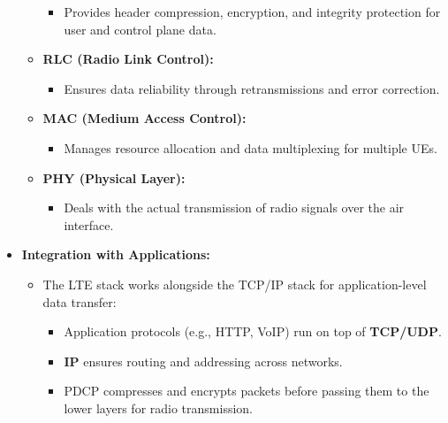 \begin{itemize}
\begin{itemize}
\begin{itemize}
            \item Provides header compression, encryption, and integrity protection for user and control plane data.
        \end{itemize}
        \item \textbf{RLC (Radio Link Control):}
        \begin{itemize}
            \item Ensures data reliability through retransmissions and error correction.
        \end{itemize}
        \item \textbf{MAC (Medium Access Control):}
        \begin{itemize}
            \item Manages resource allocation and data multiplexing for multiple UEs.
        \end{itemize}
        \item \textbf{PHY (Physical Layer):}
        \begin{itemize}
            \item Deals with the actual transmission of radio signals over the air interface.
        \end{itemize}
    \end{itemize}
    \item \textbf{Integration with Applications:}
    \begin{itemize}
        \item The LTE stack works alongside the TCP/IP stack for application-level data transfer:
        \begin{itemize}
            \item Application protocols (e.g., HTTP, VoIP) run on top of \textbf{TCP/UDP}.
            \item \textbf{IP} ensures routing and addressing across networks.
            \item PDCP compresses and encrypts packets before passing them to the lower layers for radio transmission.
        \end{itemize}
    \end{itemize}
\end{itemize}
